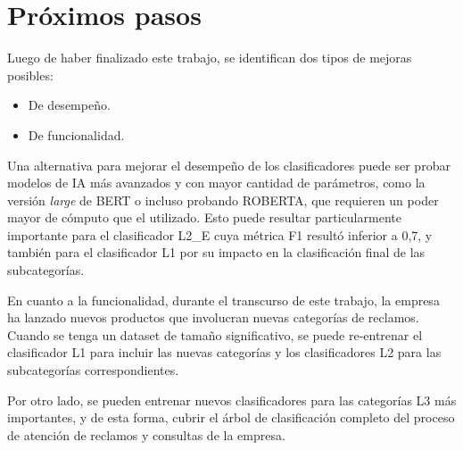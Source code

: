 \section{Próximos pasos}

Luego de haber finalizado este trabajo, se identifican dos tipos de mejoras posibles: 
\begin{itemize}
	\item De desempeño.
	\item De funcionalidad.
\end{itemize}

Una alternativa para mejorar el desempeño de los clasificadores puede ser probar modelos de IA más avanzados y con mayor cantidad de parámetros, como la versión \textit{large} de BERT o incluso probando ROBERTA, que requieren un poder mayor de cómputo que el utilizado. Esto puede resultar particularmente importante para el clasificador L2\_E cuya métrica F1 resultó inferior a 0,7, y también para el clasificador L1 por su impacto en la clasificación final de las subcategorías.

En cuanto a la funcionalidad, durante el transcurso de este trabajo, la empresa ha lanzado nuevos productos que involucran nuevas categorías de reclamos. Cuando se tenga un dataset de tamaño significativo, se puede re-entrenar el clasificador L1 para incluir las nuevas categorías y los clasificadores L2 para las subcategorías correspondientes.

Por otro lado, se pueden entrenar nuevos clasificadores para las categorías L3 más importantes, y de esta forma, cubrir el árbol de clasificación completo del proceso de atención de reclamos y consultas de la empresa.
